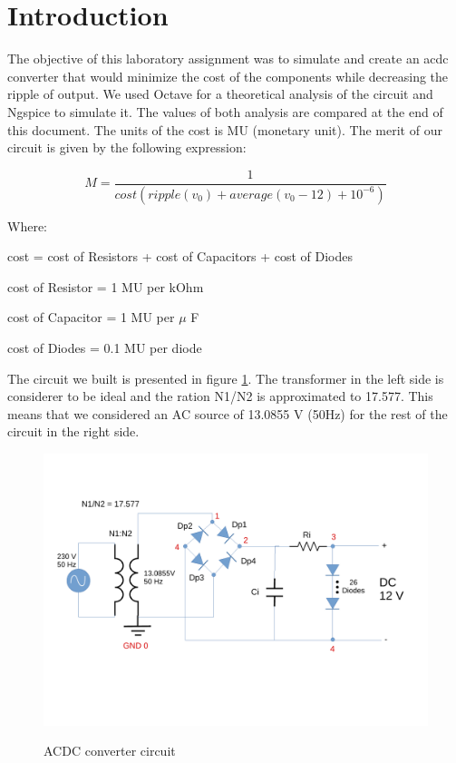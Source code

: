 \section{Introduction}
\label{sec:introduction}

The objective of this laboratory assignment was to simulate and create an acdc converter
that would minimize the cost of the components while decreasing the ripple of output.
We used Octave for a theoretical analysis of the circuit and Ngspice to simulate it.
The values of both analysis are compared at the end of this document.
The units of the cost is MU (monetary unit).
The merit of our circuit is given by the following expression:

\begin{equation}
    M = \frac{1}{cost(ripple(v_0)+average(v_0-12)+10^{-6})}
\end{equation}\par

Where: \par
cost = cost of Resistors + cost of Capacitors + cost of Diodes \par
cost of Resistor = 1 MU per kOhm \par
cost of Capacitor = 1 MU per $\mu$ F \par
cost of Diodes = 0.1 MU per diode \par

\vspace{10mm}
The circuit we built is presented in figure \ref{fig:circuit}.
The transformer in the left side is considerer to be ideal and the ration N1/N2 is approximated to 17.577.
This means that we considered an AC source of 13.0855 V (50Hz) for the rest of the circuit in the right side.

\vspace{-4mm}
\begin{figure}[ht] \centering
    \caption{ACDC converter circuit}
    \includegraphics[width=0.8\linewidth]{circuit.pdf}
    \label{fig:circuit}
\end{figure}

